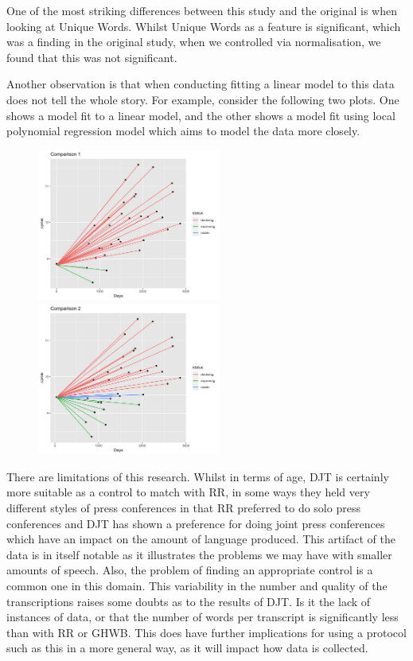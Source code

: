 \documentclass[12pt]{article}
\begin{document}
One of the most striking differences between this study and the original is when looking at Unique Words. Whilst Unique Words as a feature is significant, which was a finding in the original study, when we controlled via normalisation, we found that this was not significant. 
\par
Another observation is that when conducting fitting a linear model to this data does not tell the whole story. For example, consider the following two plots. One shows a model fit to a linear  model, and the other shows a model fit using local polynomial regression model which aims to model the data more closely. 

\begin{figure}
	\centering
	\begin{minipage}[b]{.45\textwidth}
		\includegraphics[width=6cm, height=5cm]{comp1.png}
	\end{minipage}
	\hfill
		\begin{minipage}[b]{.45\textwidth}
		\includegraphics[width=6cm, height=5cm]{comp2.png}
	\end{minipage}
\end{figure}
 
There are limitations of this research. Whilst in terms of age, DJT is certainly more suitable as a control to match with RR, in some ways they held very different styles of press conferences in that RR preferred to do solo press conferences and DJT has shown a preference for doing joint press conferences which have an impact on the amount of language produced. This artifact of the data is in itself notable as it illustrates the problems we may have with smaller amounts of speech. Also, the problem of finding an appropriate control is a common one in this domain. This variability in the number and quality of the transcriptions raises some doubts as to the results of DJT. Is it the lack of instances of data, or that the number of words per transcript is significantly less than with RR or GHWB. This does have further implications for using a protocol such as this in a more general way, as it will impact how data is collected. 
\par 
\end{document}
